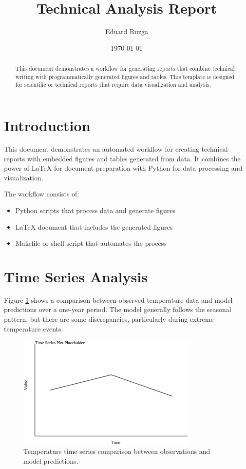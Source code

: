 \documentclass[11pt,a4paper]{article}
\title{Technical Analysis Report}
\author{Eduard Ruzga}
\date{\today}
\begin{document}
\maketitle

\begin{abstract}
This document demonstrates a workflow for generating reports that combine technical writing with programmatically generated figures and tables. This template is designed for scientific or technical reports that require data visualization and analysis.
\end{abstract}

\section{Introduction}
\label{sec:introduction}

This document demonstrates an automated workflow for creating technical reports with embedded figures and tables generated from data. It combines the power of \LaTeX{} for document preparation with Python for data processing and visualization.

The workflow consists of:
\begin{itemize}
    \item Python scripts that process data and generate figures
    \item \LaTeX{} document that includes the generated figures
    \item Makefile or shell script that automates the process
\end{itemize}

\section{Time Series Analysis}
\label{sec:timeseries}

Figure \ref{fig:timeseries} shows a comparison between observed temperature data and model predictions over a one-year period. The model generally follows the seasonal pattern, but there are some discrepancies, particularly during extreme temperature events.

\begin{figure}[H]
    \centering
    \includegraphics[width=0.8\textwidth]{figures/time_series.pdf}
    \caption{Temperature time series comparison between observations and model predictions.}
    \label{fig:timeseries}
\end{figure}
\end{document}
